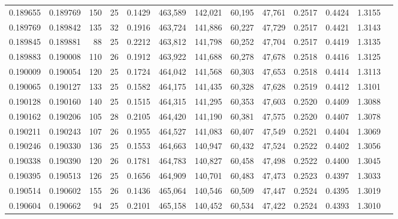 \begin{tabular}{rrrrrrrrrrrrr}
0.189655 & 0.189769 & 150 &  25 &                                     0.1429 & 463,589 & 142,021 &  60,195 &  47,761 & 0.2517 & 0.4424 & 1.3155 \\
0.189769 & 0.189842 & 135 &  32 &                                     0.1916 & 463,724 & 141,886 &  60,227 &  47,729 & 0.2517 & 0.4421 & 1.3143 \\
0.189845 & 0.189881 &  88 &  25 &                                     0.2212 & 463,812 & 141,798 &  60,252 &  47,704 & 0.2517 & 0.4419 & 1.3135 \\
0.189883 & 0.190008 & 110 &  26 &                                     0.1912 & 463,922 & 141,688 &  60,278 &  47,678 & 0.2518 & 0.4416 & 1.3125 \\
0.190009 & 0.190054 & 120 &  25 &                                     0.1724 & 464,042 & 141,568 &  60,303 &  47,653 & 0.2518 & 0.4414 & 1.3113 \\
0.190065 & 0.190127 & 133 &  25 &                                     0.1582 & 464,175 & 141,435 &  60,328 &  47,628 & 0.2519 & 0.4412 & 1.3101 \\
0.190128 & 0.190160 & 140 &  25 &                                     0.1515 & 464,315 & 141,295 &  60,353 &  47,603 & 0.2520 & 0.4409 & 1.3088 \\
0.190162 & 0.190206 & 105 &  28 &                                     0.2105 & 464,420 & 141,190 &  60,381 &  47,575 & 0.2520 & 0.4407 & 1.3078 \\
0.190211 & 0.190243 & 107 &  26 &                                     0.1955 & 464,527 & 141,083 &  60,407 &  47,549 & 0.2521 & 0.4404 & 1.3069 \\
0.190246 & 0.190330 & 136 &  25 &                                     0.1553 & 464,663 & 140,947 &  60,432 &  47,524 & 0.2522 & 0.4402 & 1.3056 \\
0.190338 & 0.190390 & 120 &  26 &                                     0.1781 & 464,783 & 140,827 &  60,458 &  47,498 & 0.2522 & 0.4400 & 1.3045 \\
0.190395 & 0.190513 & 126 &  25 &                                     0.1656 & 464,909 & 140,701 &  60,483 &  47,473 & 0.2523 & 0.4397 & 1.3033 \\
0.190514 & 0.190602 & 155 &  26 &                                     0.1436 & 465,064 & 140,546 &  60,509 &  47,447 & 0.2524 & 0.4395 & 1.3019 \\
0.190604 & 0.190662 &  94 &  25 &                                     0.2101 & 465,158 & 140,452 &  60,534 &  47,422 & 0.2524 & 0.4393 & 1.3010 \\

\end{tabular}
